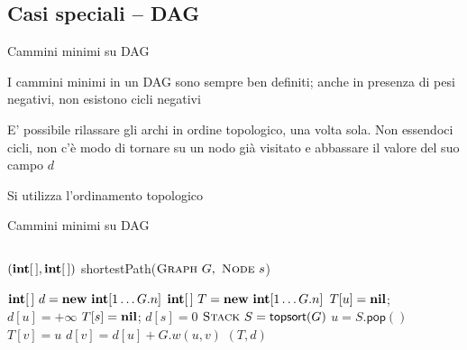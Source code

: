 \subsection{Casi speciali -- DAG}

\begin{frame}{Cammini minimi su DAG}

\vspace{-9pt}
\BIL
\item I cammini minimi in un DAG sono sempre ben definiti; anche in presenza di
pesi negativi, non esistono cicli negativi
\item E' possibile rilassare gli archi in ordine topologico, una volta sola. 
Non essendoci cicli, non c'è modo di tornare su un nodo già visitato e 
abbassare il valore del suo campo $d$
\EIL

\BIL
\item Si utilizza l'ordinamento topologico
\EIL

\end{frame}

\begin{frame}{Cammini minimi su DAG}

\vspace{-24pt}
\begin{columns}
\begin{Procedure}
\caption[A]{$(\INTARRAY, \INTARRAY)$ \textsf{shortestPath}($\textsc{Graph}\ G,\ \textsc{Node}\ s$)}
$\INTEGER[\,]\ d = \NEW\ \INTEGER[1 \mldots G.n]$
$\INTEGER[\,]\ T = \NEW\ \INTEGER[1 \mldots G.n]$
{
  $T[u] = \textbf{nil}$; $d[u] = +\infty$\; 
}
$T[s] = \textbf{nil}$; $d[s] = 0$\; 
$\textsc{Stack}\ S = \textsf{topsort}(G)$\;
{
  $u = S.\textsf{pop}()$\;
  {
    {
      $T[v] = u$\;
      $d[v] = d[u] + G.w(u,v)$\;
    }
  }
}
\Return $(T,d)$
\end{Procedure}
\end{columns}

\end{frame}


